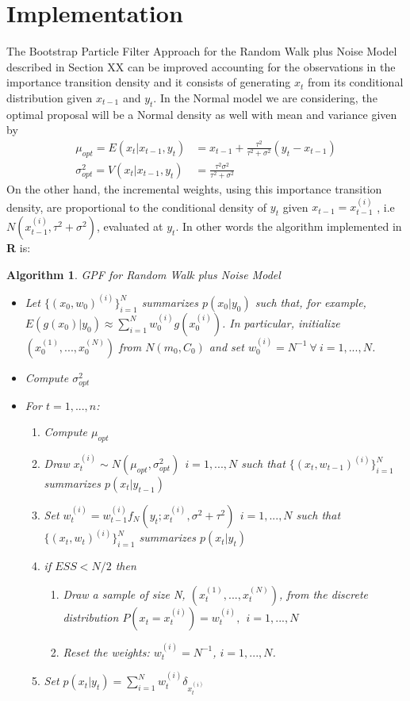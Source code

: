 \documentclass[
]{article}
\newtheorem{algorithm}{Algorithm}[section]
\begin{document}
\section{Implementation}

\hfill\break
The Bootstrap Particle Filter Approach for the Random Walk plus Noise
Model described in Section XX can be improved accounting for the
observations in the importance transition density and it consists of
generating \(x_{t}\) from its conditional distribution given \(x_{t-1}\)
and \(y_{t}\). In the Normal model we are considering, the optimal
proposal will be a Normal density as well with mean and variance given
by \begin{align*}
\mu_{opt}=E(x_{t}|x_{t-1},y_{t})&=x_{t-1}+\frac{\tau^{2}}{\tau^{2}+\sigma^{2}}(y_{t}-x_{t-1})\\
\sigma_{opt}^{2}=V(x_{t}|x_{t-1},y_{t})&=\frac{\tau^{2}\sigma^{2}}{\tau^{2}+\sigma^{2}}
\end{align*} On the other hand, the incremental weights, using this
importance transition density, are proportional to the conditional
density of \(y_{t}\) given \(x_{t-1}=x_{t-1}^{(i)}\) , i.e
\(N(x_{t-1}^{(i)},\tau^{2}+\sigma^{2})\), evaluated at \(y_{t}\). In
other words the algorithm implemented in
\textnormal{\sffamily\bfseries R} is:

\begin{algorithm} GPF for Random Walk plus Noise Model
\begin{itemize}
\item Let $\{(x_{0},w_{0})^{(i)}\}_{i=1}^{N}$ summarizes $p(x_{0}|y_{0})$ such that, for example, $E(g(x_{0})|y_{0}) \approx \sum_{i=1}^{N}w_{0}^{(i)}g(x_{0}^{(i)})$. In particular, initialize $(x_{0}^{(1)},...,x_{0}^{(N)})$ from $N(m_{0},C_{0})$ and set $w_{0}^{(i)}=N^{-1} \ \forall \ i=1,...,N$.
\item Compute $\sigma_{opt}^{2}$ 
\item For $t=1,...,n$:
\begin{enumerate}
\item Compute $\mu_{opt}$
\item Draw $x_{t}^{(i)} \sim N(\mu_{opt},\sigma_{opt}^{2}) \ \ i=1,...,N$ such that $\{(x_{t},w_{t-1})^{(i)}\}_{i=1}^{N}$ summarizes $p(x_{t}|y_{t-1})$
\item Set $w_{t}^{(i)} = w_{t-1}^{(i)}f_{N}(y_{t};x_{t}^{(i)},\sigma^2+\tau^{2}) \ \ i=1,...,N$ such that $\{(x_{t},w_{t})^{(i)}\}_{i=1}^{N}$ summarizes $p(x_{t}|y_{t})$
\item if $ESS<N/2$ then
\begin{enumerate}
\item Draw a sample of size N, $(x_{t}^{(1)},...,x_{t}^{(N)})$, from the discrete distribution $P(x_{t}=x_{t}^{(i)})=w_{t}^{(i)},\ \ i=1,...,N$
\item Reset the weights: $w_{t}^{(i)}=N^{-1}$, $i=1,...,N$.
\end{enumerate}
\item Set $p(x_{t}|y_{t})=\sum_{i=1}^{N}w_{t}^{(i)}\delta_{x_{t}^{(i)}}$
\end{enumerate}
\end{itemize}
\end{algorithm}
\end{document}
